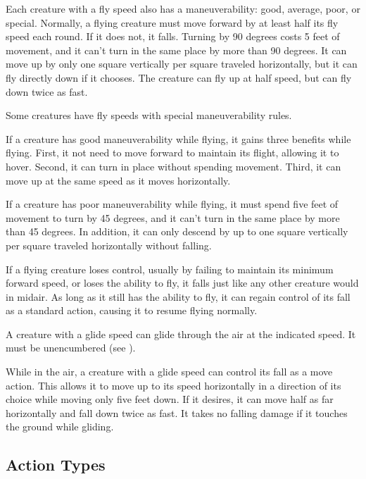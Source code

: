             Each creature with a fly speed also has a maneuverability: good, average, poor, or special. Normally, a flying creature must move forward by at least half its fly speed each round. If it does not, it falls. Turning by 90 degrees costs 5 feet of movement, and it can't turn in the same place by more than 90 degrees. It can move up by only one square vertically per square traveled horizontally, but it can fly directly down if it chooses. The creature can fly up at half speed, but can fly down twice as fast.

            \label{Maneuverability} Some creatures have fly speeds with special maneuverability rules.

             If a creature has good maneuverability while flying, it gains three benefits while flying.
            First, it not need to move forward to maintain its flight, allowing it to hover.
            Second, it can turn in place without spending movement.
            Third, it can move up at the same speed as it moves horizontally.

             If a creature has poor maneuverability while flying, it must spend five feet of movement to turn by 45 degrees, and it can't turn in the same place by more than 45 degrees. In addition, it can only descend by up to one square vertically per square traveled horizontally without falling.

             If a flying creature loses control, usually by failing to maintain its minimum forward speed, or loses the ability to fly, it falls just like any other creature would in midair. As long as it still has the ability to fly, it can regain control of its fall as a standard action, causing it to resume flying normally.

            \label{Gliding}
            A creature with a glide speed can glide through the air at the indicated speed. It must be unencumbered (see ).

            While in the air, a creature with a glide speed can control its fall as a move action. This allows it to move up to its speed horizontally in a direction of its choice while moving only five feet down. If it desires, it can move half as far horizontally and fall down twice as fast. It takes no falling damage if it touches the ground while gliding.

    \subsection{Action Types}


